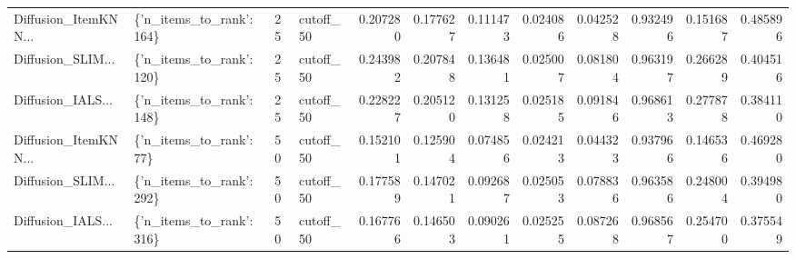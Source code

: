 \begin{tabular}{llllrrrrrrrr}
Diffusion\_ItemKNN... & \{'n\_items\_to\_rank': 164\} &       25 & cutoff\_50 & 0.207280 &   0.177627 & 0.111473 & 0.024086 &        0.042528 &                   0.932496 &       0.151687 &            0.485896 \\
Diffusion\_SLIM... & \{'n\_items\_to\_rank': 120\} &       25 & cutoff\_50 & 0.243982 &   0.207848 & 0.136481 & 0.025007 &        0.081804 &                   0.963197 &       0.266289 &            0.404516 \\
Diffusion\_IALS... & \{'n\_items\_to\_rank': 148\} &       25 & cutoff\_50 & 0.228227 &   0.205120 & 0.131258 & 0.025185 &        0.091846 &                   0.968613 &       0.277878 &            0.384110 \\
Diffusion\_ItemKNN... &  \{'n\_items\_to\_rank': 77\} &       50 & cutoff\_50 & 0.152101 &   0.125904 & 0.074856 & 0.024213 &        0.044323 &                   0.937966 &       0.146536 &            0.469280 \\
Diffusion\_SLIM... & \{'n\_items\_to\_rank': 292\} &       50 & cutoff\_50 & 0.177589 &   0.147021 & 0.092687 & 0.025053 &        0.078836 &                   0.963586 &       0.248004 &            0.394980 \\
Diffusion\_IALS... & \{'n\_items\_to\_rank': 316\} &       50 & cutoff\_50 & 0.167766 &   0.146503 & 0.090261 & 0.025255 &        0.087268 &                   0.968567 &       0.254700 &            0.375549 \\
\bottomrule
\end{tabular}
